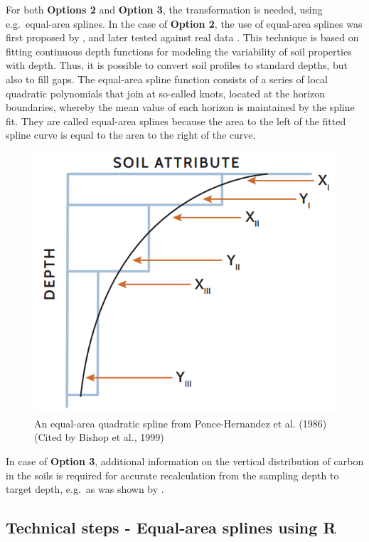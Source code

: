 \documentclass[10pt,b5paper,]{book}
\theoremstyle{definition}
\theoremstyle{definition}
\theoremstyle{definition}
\theoremstyle{remark}
\begin{document}
For both \textbf{Options 2} and \textbf{Option 3}, the transformation is
needed, using e.g.~equal-area splines. In the case of \textbf{Option 2},
the use of equal-area splines was first proposed by
\cite{ponce1986improved}, and later tested against real data
\citep{bishop1999modelling}. This technique is based on fitting
continuous depth functions for modeling the variability of soil
properties with depth. Thus, it is possible to convert soil profiles to
standard depths, but also to fill gaps. The equal-area spline function
consists of a series of local quadratic polynomials that join at
so-called knots, located at the horizon boundaries, whereby the mean
value of each horizon is maintained by the spline fit. They are called
equal-area splines because the area to the left of the fitted spline
curve is equal to the area to the right of the curve.

\begin{figure}

{\centering \includegraphics[width=0.8\linewidth]{images/spline} 

}

\caption{An equal-area quadratic spline from Ponce-Hernandez et al. (1986) (Cited by Bishop et al., 1999)}\label{fig:unnamed-chunk-15}
\end{figure}

In case of \textbf{Option 3}, additional information on the vertical
distribution of carbon in the soils is required for accurate
recalculation from the sampling depth to target depth, e.g.~as was shown
by \cite{bernoux1998modeling}.

\hypertarget{EqualAreaSplines}{%
\subsection{Technical steps - Equal-area splines using
R}\label{EqualAreaSplines}}
\end{document}
